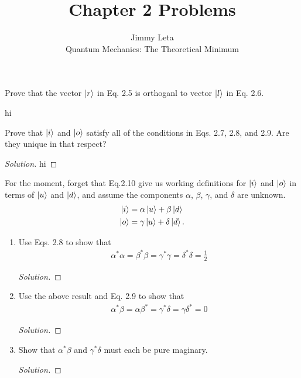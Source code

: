 \documentclass[10pt]{article}
\newenvironment{problem}[2][Problem]{\begin{trivlist}
\item[\hskip \labelsep {\bfseries #1}\hskip \labelsep {\bfseries #2.}]}{\end{trivlist}}
\begin{document}
\title{Chapter 2 Problems}
\author{Jimmy Leta\\
  Quantum Mechanics: The Theoretical Minimum}
\maketitle

\begin{problem}{2.1}
Prove that the vector $\ket{r}$ in Eq. 2.5 is orthoganl to vector $\ket{l}$ in Eq. 2.6.
\end{problem}

hi
%

\begin{problem}{2.2}
Prove that $\ket{i}$ and $\ket{o}$ satisfy all of the conditions in Eqs. 2.7, 2.8, and 2.9. Are they unique in that respect?
\end{problem}

\begin{proof}[Solution]
  hi
\end{proof}

\begin{problem}{2.3}
For the moment, forget that Eq.2.10 give us working definitions for $\ket{i}$ and $\ket{o}$
in terms of $\ket{u}$ and $\ket{d}$, and assume the components $\alpha$, $\beta$, $\gamma$, and
$\delta$ are unknown.
\begin{align*}
  \ket{i} & = \alpha \ket{u} + \beta\ket{d}   \\
  \ket{o} & = \gamma \ket{u} + \delta\ket{d}.
\end{align*}

\begin{enumerate}
  \item[a)] Use Eqs. 2.8 to show that
        \begin{align*}
          \alpha^*\alpha = \beta^*\beta = \gamma^*\gamma = \delta^*\delta = \frac{1}{2}
        \end{align*}
        \begin{proof}[Solution]
        \end{proof}

  \item[b)] Use the above result and Eq. 2.9 to show that
        \begin{align*}
          \alpha^*\beta = \alpha\beta^* = \gamma^*\delta = \gamma\delta^* = 0
        \end{align*}
        \begin{proof}[Solution]
        \end{proof}

  \item[c)] Show that $\alpha^*\beta$ and $\gamma^*\delta$ must each be pure maginary.
        \begin{proof}[Solution]
        \end{proof}
\end{enumerate}

\end{problem}
\end{document}

